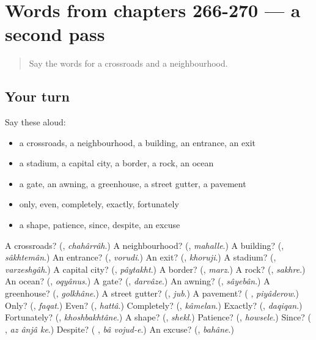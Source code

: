 \section[(dialogue)]{Words from chapters 266-270 — a second pass}

\label{lesson:FA-R270-second-pass-words-from-chapters-266-270}



\begin{quote}
Say the words for a crossroads and a neighbourhood.
\end{quote}

\subsection*{Your turn}
Say these aloud:

\begin{itemize}
\raggedright
  \item a crossroads, a neighbourhood, a building, an entrance, an exit
  \item a stadium, a capital city, a border, a rock, an ocean
  \item a gate, an awning, a greenhouse, a street gutter, a pavement
  \item only, even, completely, exactly, fortunately
  \item a shape, patience, since, despite, an excuse
\end{itemize}

\begin{tcolorbox}[breakable,colback=teal!4,colframe=teal!35!black,title={Before you move on}]
A crossroads? (\textbf{}, \emph{chahârrâh}.) A neighbourhood? (\textbf{}, \emph{mahalle}.) A building? (\textbf{}, \emph{sâkhtemân}.) An entrance? (\textbf{}, \emph{vorudi}.) An exit? (\textbf{}, \emph{khoruji}.) A stadium? (\textbf{}, \emph{varzeshgâh}.) A capital city? (\textbf{}, \emph{pâytakht}.) A border? (\textbf{}, \emph{marz}.) A rock? (\textbf{}, \emph{sakhre}.) An ocean? (\textbf{}, \emph{oqyânus}.) A gate? (\textbf{}, \emph{darvâze}.) An awning? (\textbf{}, \emph{sâyebân}.) A greenhouse? (\textbf{}, \emph{golkhâne}.) A street gutter? (\textbf{}, \emph{jub}.) A pavement? (\textbf{ }, \emph{piyâderow}.) Only? (\textbf{}, \emph{faqat}.) Even? (\textbf{}, \emph{hattâ}.) Completely? (\textbf{}, \emph{kâmelan}.) Exactly? (\textbf{}, \emph{daqiqan}.) Fortunately? (\textbf{}, \emph{khoshbakhtâne}.) A shape? (\textbf{}, \emph{shekl}.) Patience? (\textbf{}, \emph{howsele}.) Since? (\textbf{  }, \emph{az ânjâ ke}.) Despite? (\textbf{ }, \emph{bâ vojud-e}.) An excuse? (\textbf{}, \emph{bahâne}.)
\end{tcolorbox}
